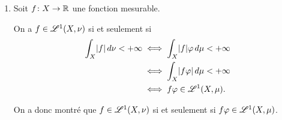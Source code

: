 {\begin{td-sol}[]
\begin{enumerate}
\begin{enumerate}
\begin{itemize}
                    \item Si \(f\) est une fonction mesurable positive, 
                    alors il existe une suite croissante de fonctions étagées positives
                    \({\left(f_n\right)}_{n\in\N}\) qui converge simplement vers \(f\). On a alors
                    \begin{equation*}
                        \begin{aligned}
                            \int_X f\der\nu
                            =& \int_X \lim_{n\to+\infty}f_n\der\nu \\
                            \overset{TCM}{=}& \lim_{n\to+\infty}\int_X f_n\der\nu \\
                            \overset{(a)}{=}& \lim_{n\to+\infty}\int_X f_n\varphi\der\mu \\
                            \overset{TCM}{=}& \int_X \lim_{n\to+\infty}f_n\varphi\der\mu \\
                            =& \int_X f\varphi\der\mu.
                        \end{aligned}
                    \end{equation*}
                \end{itemize}

                On a donc montré que pour toute fonction mesurable positive \(f\colon X\to\ff{0,+\infty}\),
                \begin{equation*}
                    \int_X f\der\nu=\int_X f\varphi\der\mu.
                \end{equation*}

                \item Soit \(f\colon X\to\mathbb{R}\) une fonction mesurable.

                On a \(f\in\mathscr{L}^1(X,\nu)\) si et seulement si
                \begin{equation*}
                    \begin{aligned}
                        \int_X \mathopen{}\left|f\right|\mathclose{}\mathop{}\!{d}\nu < +\infty
                        &\iff \int_X \mathopen{}\left|f\right|\mathclose{}\varphi\mathop{}\!{d}\mu < +\infty \\
                        &\iff \int_X \mathopen{}\left|f\varphi\right|\mathclose{}\mathop{}\!{d}\mu < +\infty \\
                        &\iff f\varphi\in\mathscr{L}^1(X,\mu).
                    \end{aligned}
                \end{equation*}

                On a donc montré que \(f\in\mathscr{L}^1(X,\nu)\) si et seulement si \(f\varphi\in\mathscr{L}^1(X,\mu)\).


\end{enumerate}
\end{enumerate}
\end{td-sol}}

